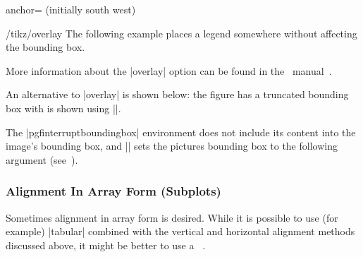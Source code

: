 \begin{pgfplotskey}{anchor= (initially south west)}
\begin{key}{/tikz/overlay}
The following example places a legend somewhere without affecting the bounding box.
\begin{codeexample}[]
\end{codeexample}

	More information about the |overlay| option can be found in the \PGF\ manual~\cite{tikz}.
\end{key}


\label{sec:bounding:box:example}%
{%
An alternative to |overlay| is shown below: the figure has a truncated bounding box with is shown using |\fbox|.
\begin{codeexample}[]
\setlength{\fboxsep}{0pt}%
%
\end{codeexample}%
}%
The |pgfinterruptboundingbox| environment does not include its content into the image's bounding box, and |\useasboundingbox| sets the pictures bounding box to the following argument (see~\cite{tikz}).

\end{pgfplotskey}

\subsubsection{Alignment In Array Form (Subplots)}
%
%
%
%
Sometimes alignment in array form is desired. While it is possible to use (for example) |tabular| combined with the vertical and horizontal alignment methods discussed above, it might be better to use a \Tikz\ .

